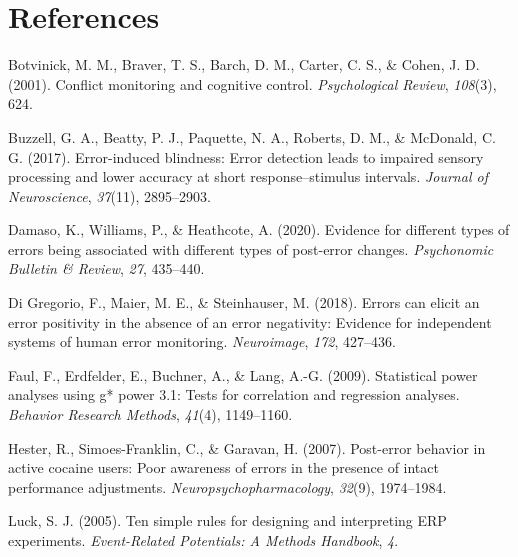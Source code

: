 \documentclass[
  man,floatsintext]{apa7}
\newlength{\cslhangindent}
\newlength{\cslentryspacingunit} %
\newenvironment{CSLReferences}[2] %
 {%
  \setlength{\parindent}{0pt}
  \ifodd #1
  \let\oldpar\par
  \def\par{\hangindent=\cslhangindent\oldpar}
  \fi
  \setlength{\parskip}{#2\cslentryspacingunit}
 }%
 {}
\begin{document}
\newpage

\hypertarget{references}{%
\section{References}\label{references}}

\hypertarget{refs}{}
\begin{CSLReferences}{1}{0}
\leavevmode{}%
Botvinick, M. M., Braver, T. S., Barch, D. M., Carter, C. S., \& Cohen, J. D. (2001). Conflict monitoring and cognitive control. \emph{Psychological Review}, \emph{108}(3), 624.

\leavevmode{}%
Buzzell, G. A., Beatty, P. J., Paquette, N. A., Roberts, D. M., \& McDonald, C. G. (2017). Error-induced blindness: Error detection leads to impaired sensory processing and lower accuracy at short response--stimulus intervals. \emph{Journal of Neuroscience}, \emph{37}(11), 2895--2903.

\leavevmode{}%
Damaso, K., Williams, P., \& Heathcote, A. (2020). Evidence for different types of errors being associated with different types of post-error changes. \emph{Psychonomic Bulletin \& Review}, \emph{27}, 435--440.

\leavevmode{}%
Di Gregorio, F., Maier, M. E., \& Steinhauser, M. (2018). Errors can elicit an error positivity in the absence of an error negativity: Evidence for independent systems of human error monitoring. \emph{Neuroimage}, \emph{172}, 427--436.

\leavevmode{}%
Faul, F., Erdfelder, E., Buchner, A., \& Lang, A.-G. (2009). Statistical power analyses using g* power 3.1: Tests for correlation and regression analyses. \emph{Behavior Research Methods}, \emph{41}(4), 1149--1160.

\leavevmode{}%
Hester, R., Simoes-Franklin, C., \& Garavan, H. (2007). Post-error behavior in active cocaine users: Poor awareness of errors in the presence of intact performance adjustments. \emph{Neuropsychopharmacology}, \emph{32}(9), 1974--1984.

\leavevmode{}%
Luck, S. J. (2005). Ten simple rules for designing and interpreting ERP experiments. \emph{Event-Related Potentials: A Methods Handbook}, \emph{4}.

\end{CSLReferences}
\end{document}
